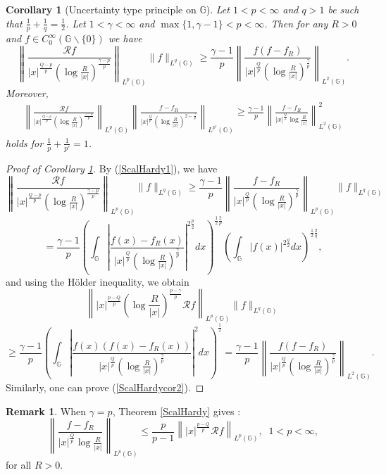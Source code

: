 \documentclass[a4paper,12pt,reqno]{amsart}
\renewcommand\eqref[1]{(\ref{#1})} %
\numberwithin{equation}{section}
\theoremstyle{plain}
\newtheorem{cor}[thm]{Corollary}
\theoremstyle{definition}
\newtheorem{rem}[thm]{Remark}
\begin{document}
\begin{cor}[{\rm Uncertainty type principle on $\mathbb{G}$}]\label{ScalHardycor} Let $1<p<\infty$ and $q>1$ be such that
$\frac{1}{p}+\frac{1}{q}=\frac{1}{2}$. Let $1<\gamma<\infty$ and $\max\{1,\gamma-1\}<p<\infty$. Then for any $R>0$ and $f\in C_{0}^{\infty}(\mathbb{G}\backslash\{0\})$ we have
\begin{equation}\label{ScalHardycor1}
\left\|\frac{\mathcal{R}f}{|x|^{\frac{Q-p}{p}}\left(\log\frac{R}{|x|}\right)^{\frac{\gamma-p}{p}}} \right\|_{L^{p}(\mathbb{G})}\|f\|_{L^{q}(\mathbb{G})}
\geq\frac{\gamma-1}{p}\left\|\frac{f(f-f_{R})}
{|x|^{\frac{Q}{p}}\left(\log\frac{R}{|x|}\right)^{\frac{\gamma}{p}}} \right\|_{L^{2}(\mathbb{G})}.
\end{equation}
Moreover,
\begin{multline}\label{ScalHardycor2}
\left\|\frac{\mathcal{R}f}{|x|^{\frac{Q-p}{p}}\left(\log\frac{R}{|x|}\right)^{\frac{\gamma-p}{p}}} \right\|_{L^{p}(\mathbb{G})}\left\|\frac{f-f_{R}}
{|x|^{\frac{Q}{p'}}\left(\log\frac{R}{|x|}\right)^{2-\frac{\gamma}{p}}}
\right\|_{L^{p'}(\mathbb{G})}\geq\frac{\gamma-1}{p}\left\|\frac{f-f_{R}}
{|x|^{\frac{Q}{2}}\log\frac{R}{|x|}}\right\|^{2}_{L^{2}(\mathbb{G})}
\end{multline}
holds for $\frac{1}{p}+\frac{1}{p'}=1$.
\end{cor}
\begin{proof}[Proof of Corollary \ref{ScalHardycor}]
By \eqref{ScalHardy1}, we have
$$\left\|\frac{\mathcal{R}f}{|x|^{\frac{Q-p}{p}}\left(\log\frac{R}{|x|}\right)^{\frac{\gamma-p}{p}}} \right\|_{L^{p}(\mathbb{G})}\|f\|_{L^{q}(\mathbb{G})}\geq\frac{\gamma-1}{p}
\left\|\frac{f-f_{R}}{|x|^{\frac{Q}{p}}\left(\log\frac{R}{|x|}\right)^{\frac{\gamma}{p}}}\right\|_{L^{p}(\mathbb{G})}
\|f\|_{L^{q}(\mathbb{G})}$$
$$=\frac{\gamma-1}{p}
\left(\int_{\mathbb{G}}\left|\frac{f(x)-f_{R}(x)}{|x|^{\frac{Q}{p}}\left(\log\frac{R}{|x|}\right)^{\frac{\gamma}{p}}}
\right|^{2\frac{p}{2}}dx\right)^{\frac{1}{2}\frac{2}{p}}
\left(\int_{\mathbb{G}}|f(x)|^{2\frac{q}{2}}dx\right)^{\frac{1}{2}\frac{2}{q}},$$
and using the H\"{o}lder inequality, we obtain
$$\left\||x|^{\frac{p-Q}{p}}\left(\log\frac{R}{|x|}\right)^{\frac{p-\gamma}{p}}
\mathcal{R}f \right\|_{L^{p}(\mathbb{G})}\|f\|_{L^{q}(\mathbb{G})}$$
$$\geq\frac{\gamma-1}{p}\left(\int_{\mathbb{G}}\left|\frac{f(x)(f(x)-f_{R}(x))}
{|x|^{\frac{Q}{p}}\left(\log\frac{R}{|x|}\right)^{\frac{\gamma}{p}}}\right|^{2}dx\right)^{\frac{1}{2}}
=\frac{\gamma-1}{p}\left\|\frac{f(f-f_{R})}
{|x|^{\frac{Q}{p}}\left(\log\frac{R}{|x|}\right)^{\frac{\gamma}{p}}} \right\|_{L^{2}(\mathbb{G})}.$$
Similarly, one can prove \eqref{ScalHardycor2}.
\end{proof}
\begin{rem}\label{ScalHardyrem}
When $\gamma=p$, Theorem \ref{ScalHardy} gives \cite[Theorem 3.1]{Ruzhansky-Suragan:critical}:
\begin{equation}\label{ScalHardy4}
\left\|\frac{f-f_{R}}{|x|^{\frac{Q}{p}}\log\frac{R}{|x|}}\right\|_{L^{p}(\mathbb{G})}
\leq\frac{p}{p-1}\left\||x|^{\frac{p-Q}{p}}
\mathcal{R}f \right\|_{L^{p}(\mathbb{G})}, \;\;1<p<\infty,
\end{equation}
for all $R>0$.
\end{rem}
\end{document}
